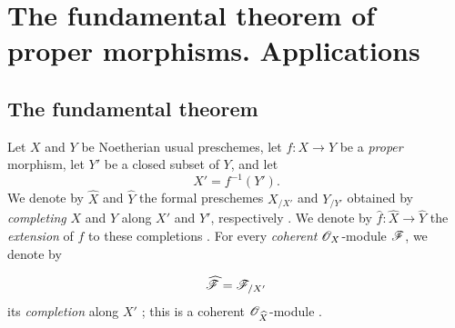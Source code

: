 \section{The fundamental theorem of proper morphisms. Applications}
\label{section:III.4}


\subsection{The fundamental theorem}
\label{subsection:III.4.1}

\begin{env}[4.1.1]
\label{III.4.1.1}
Let $X$ and $Y$ be Noetherian usual preschemes, let $f:X\to Y$ be a
\emph{proper} morphism, let $Y'$ be a closed subset of $Y$, and let
\[
  X'=f^{-1}(Y').
\]
We denote by $\widehat{X}$ and $\widehat{Y}$ the formal preschemes
$X_{/X'}$ and $Y_{/Y'}$ obtained by \emph{completing} $X$ and $Y$ along
$X'$ and $Y'$, respectively .
We denote by $\widehat{f}:\widehat{X}\to\widehat{Y}$ the \emph{extension} of
$f$ to these completions .
For every \emph{coherent} $\mathscr{O}_X$-module $\mathscr{F}$, we denote by


\[
  \widehat{\mathscr{F}}=\mathscr{F}_{/X'}
\]
its \emph{completion} along $X'$ ; this is a coherent
$\mathscr{O}_{\widehat{X}}$-module .
\end{env}

